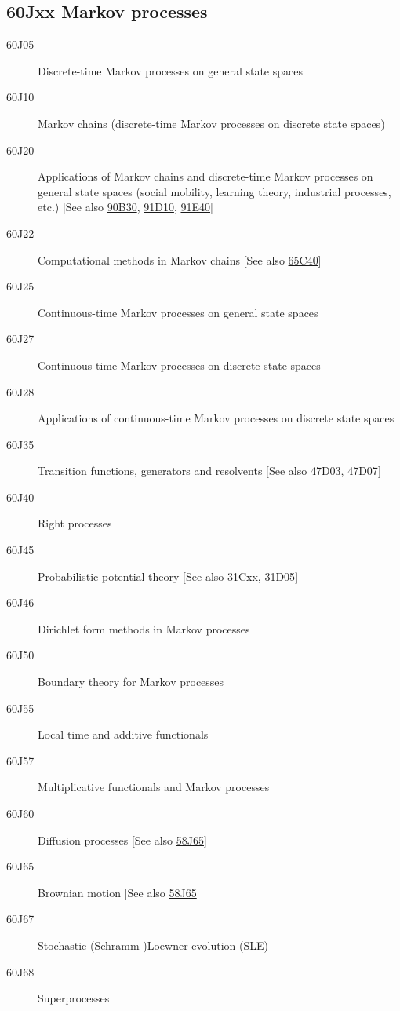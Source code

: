 \subsection*{60Jxx  Markov processes }\label{60Jxx}
\begin{description}  
\item [60J05]\label{60J05} Discrete-time Markov processes on general state spaces
\item [60J10]\label{60J10} Markov chains (discrete-time Markov processes on discrete state spaces)
\item [60J20]\label{60J20} Applications of Markov chains and discrete-time Markov processes on general state spaces (social mobility, learning theory, industrial processes, etc.) [See also \hyperref[90B30]{90B30}, \hyperref[91D10]{91D10}, \hyperref[91E40]{91E40}]
\item [60J22]\label{60J22} Computational methods in Markov chains [See also \hyperref[65C40]{65C40}]
\item [60J25]\label{60J25} Continuous-time Markov processes on general state spaces
\item [60J27]\label{60J27} Continuous-time Markov processes on discrete state spaces
\item [60J28]\label{60J28} Applications of continuous-time Markov processes on discrete state spaces
\item [60J35]\label{60J35} Transition functions, generators and resolvents [See also \hyperref[47D03]{47D03}, \hyperref[47D07]{47D07}]
\item [60J40]\label{60J40} Right processes
\item [60J45]\label{60J45} Probabilistic potential theory [See also \hyperref[31Cxx]{31Cxx}, \hyperref[31D05]{31D05}]
\item [60J46]\label{60J46} Dirichlet form methods in Markov processes
\item [60J50]\label{60J50} Boundary theory for Markov processes
\item [60J55]\label{60J55} Local time and additive functionals
\item [60J57]\label{60J57} Multiplicative functionals and Markov processes
\item [60J60]\label{60J60} Diffusion processes [See also \hyperref[58J65]{58J65}]
\item [60J65]\label{60J65} Brownian motion [See also \hyperref[58J65]{58J65}]
\item [60J67]\label{60J67} Stochastic (Schramm-)Loewner evolution (SLE)
\item [60J68]\label{60J68} Superprocesses

\end{description}
